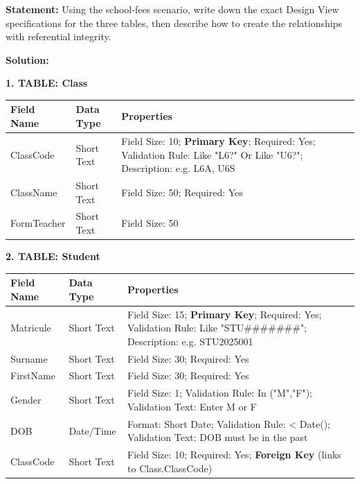 \documentclass[11pt]{article}
\begin{document}
\begin{exoresolu}
\textbf{Statement:} Using the school-fees scenario, write down the exact Design View specifications for the three tables, then describe how to create the relationships with referential integrity.

\textbf{Solution:}

\textbf{1. TABLE: Class}
\begin{center}
\begin{tabularx}{\linewidth}{|l|l|X|}\hline
Field Name & Data Type & Properties \\ \hline
ClassCode & Short Text & Field Size: 10; \textbf{Primary Key}; Required: Yes; Validation Rule: Like "L6?" Or Like "U6?"; Description: e.g. L6A, U6S \\ \hline
ClassName & Short Text & Field Size: 50; Required: Yes \\ \hline
FormTeacher & Short Text & Field Size: 50 \\ \hline
\end{tabularx}
\end{center}

\textbf{2. TABLE: Student}
\begin{center}
\begin{tabularx}{\linewidth}{|l|l|X|}\hline
Field Name & Data Type & Properties \\ \hline
Matricule & Short Text & Field Size: 15; \textbf{Primary Key}; Required: Yes; Validation Rule: Like "STU\#\#\#\#\#\#\#"; Description: e.g. STU2025001 \\ \hline
Surname & Short Text & Field Size: 30; Required: Yes \\ \hline
FirstName & Short Text & Field Size: 30; Required: Yes \\ \hline
Gender & Short Text & Field Size: 1; Validation Rule: In ("M","F"); Validation Text: Enter M or F \\ \hline
DOB & Date/Time & Format: Short Date; Validation Rule: < Date(); Validation Text: DOB must be in the past \\ \hline
ClassCode & Short Text & Field Size: 10; Required: Yes; \textbf{Foreign Key} (links to Class.ClassCode) \\ \hline
\end{tabularx}
\end{center}


\end{exoresolu}
\end{document}
